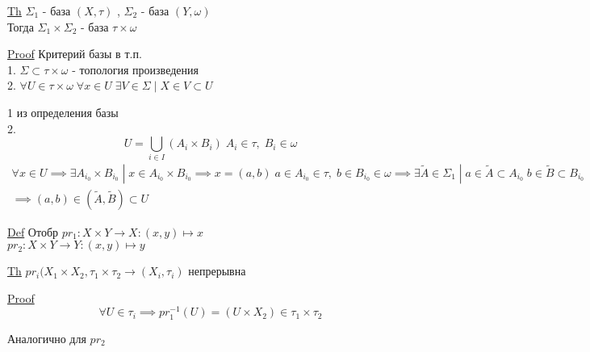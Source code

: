 \documentclass[a4paper]{article}
\begin{document}
\begin{tcolorbox}
    \underline{Th} $ \Sigma_{1} $ - база $ (X, \tau) $ , $ \Sigma_{2} $ - база
    $ (Y, \omega) $ \\
    Тогда $ \Sigma_{1} \times \Sigma_{2} $  - база $ \tau \times \omega $ 

    \underline{Proof}
    Критерий базы в т.п.\\
    1. $ \Sigma \subset \tau \times \omega $ - топология произведения\\
    2. $ \forall U \in \tau \times \omega \; \forall x \in U \; \exists V \in \Sigma
    \; | \; X \in V \subset U$ 
    
    1 из определения базы\\

    2. \[
        U = \bigcup_{i \in I} (A_{i} \times B_{i}) \; A_{i} \in \tau, \; B_{i} \in \omega
    \]
    \begin{equation*}
        \begin{aligned}
        \forall x \in U \implies \exists A_{i_0} \times B_{i_0}\; | \; x \in
        A_{i_0} \times B_{i_0} \implies x = (a,b) \; a \in A_{i_0} \in \tau, 
        \; b \in B_{i_0} \in \omega \implies \exists \tilde{A} \in \Sigma_{1} \;
        | \; a \in \tilde{A} \subset A_{i_0}\; b \in \tilde{B} \subset B_{i_0}\\
        \implies (a,b) \in (\tilde{A}, \tilde{B}) \subset U
        \end{aligned}
    \end{equation*}
\end{tcolorbox}

\underline{Def} Отобр $ pr_{1}: X\times Y \to X:(x,y) \mapsto x $ \\
$ pr_{2}: X\times Y \to Y:(x,y) \mapsto y $

\begin{tcolorbox}
    \underline{Th} $ pr_{i} (X_1 \times X_2, \tau_{1} \times \tau_{2} \to
    (X_{i}, \tau_{i})$ непрерывна

    \underline{Proof}\[
        \forall U \in \tau_{i} \implies pr_{1}^{-1}(U) = (U \times X_2)
        \in \tau_{1} \times \tau_{2}
    \]

    Аналогично для $ pr_{2} $ 
\end{tcolorbox}
\end{document}
